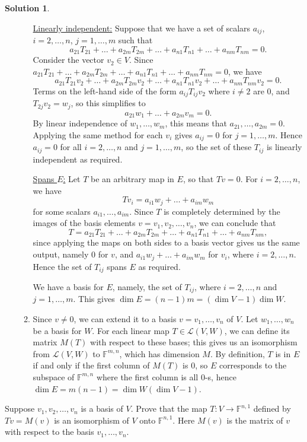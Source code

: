 \documentclass[12pt]{article}
\theoremstyle{definition}
\theoremstyle{definition}
\newtheorem*{soln}{Solution}
\newcommand{\F}{\mathbb{F}}
\begin{document}
\begin{soln}
\begin{enumerate}[label=\arabic*.]
\begin{enumerate}[label=\textbf{Method \arabic*.}]
\underline{Linearly independent:} Suppose that we have a set of scalars $a_{ij}$, $i=2,\dots,n$, $j=1,\dots,m$ such that
\[a_{21}T_{21}+\dots+a_{2m}T_{2m}+\dots+a_{n1}T_{n1}+\dots+a_{nm}T_{nm}=0.\]
Consider the vector $v_2\in V$. Since $a_{21}T_{21}+\dots+a_{2m}T_{2m}+\dots+a_{n1}T_{n1}+\dots+a_{nm}T_{nm}=0$, we have
\[a_{21}T_{21}v_2+\dots+a_{2m}T_{2m}v_2+\dots+a_{n1}T_{n1}v_2+\dots+a_{nm}T_{nm}v_2=0.\]
Terms on the left-hand side of the form $a_{ij}T_{ij}v_2$ where $i\neq 2$ are $0$, and $T_{2j}v_2=w_j$, so this simplifies to
\[a_{21}w_1+\dots+a_{2m}v_m=0.\]
By linear independence of $w_1,\dots,w_m$, this means that $a_{21},\dots,a_{2m}=0$. Applying the same method for each $v_i$ gives $a_{ij}=0$ for $j=1,\dots,m$. Hence $a_{ij}=0$ for all $i=2,\dots,n$ and $j=1,\dots,m$, so the set of these $T_{ij}$ is linearly independent as required.

\underline{Spans $E$:} Let $T$ be an arbitrary map in $E$, so that $Tv=0$. For $i=2,\dots,n$, we have
\[Tv_i=a_{i1}w_j+\dots+a_{im}w_m\]
for some scalars $a_{i1},\dots,a_{im}$. Since $T$ is completely determined by the images of the basis elements $v=v_1,v_2,\dots,v_n$, we can conclude that
\[T=a_{21}T_{21}+\dots+a_{2m}T_{2m}+\dots+a_{n1}T_{n1}+\dots+a_{nm}T_{nm},\]
since applying the maps on both sides to a basis vector gives us the same output, namely $0$ for $v$, and $a_{i1}w_j+\dots+a_{im}w_m$ for $v_i$, where $i=2,\dots, n$. Hence the set of $T_{ij}$ spans $E$ as required.

We have a basis for $E$, namely, the set of $T_{ij}$, where $i=2,\dots,n$ and $j=1,\dots,m$. This gives $\dim E=(n-1)m=(\dim V-1)\dim W$.

\item Since $v\neq 0$, we can extend it to a basis $v=v_1,\dots,v_n$ of $V$. Let $w_1,\dots,w_n$ be a basis for $W$. For each linear map $T\in\mathcal{L}(V,W)$, we can define its matrix $M(T)$ with respect to these bases; this gives us an isomorphism from $\mathcal{L}(V,W)$ to $\F^{m,n}$, which has dimension $M$. By definition, $T$ is in $E$ if and only if the first column of $M(T)$ is $0$, so $E$ corresponds to the subspace of $\F^{m,n}$ where the first column is all $0$-s, hence $\dim E=m(n-1)=\dim W(\dim V-1)$.
\end{enumerate}
\end{enumerate}
\end{soln}

\begin{prob}[Axler 3.D.14]
Suppose $v_1,v_2,\dots,v_n$ is a basis of $V$. Prove that the map $T:V\to \F^{n,1}$ defined by $Tv=M(v)$ is an isomorphism of $V$ onto $\F^{n,1}$. Here $M(v)$ is the matrix of $v$ with respect to the basis $v_1,\dots,v_n$.
\end{prob}
\end{document}
